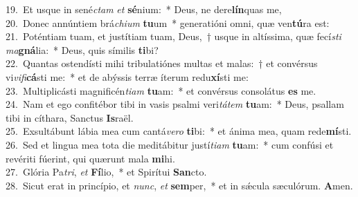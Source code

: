 {19.~}Et usque in sené\textit{ctam} \textit{et} \textbf{sé}nium:~* Deus, ne dere\textbf{lín}quas me,\\
{20.~}Donec annúntiem brá\textit{chi}\textit{um} \textbf{tu}um~* generatióni omni, quæ ven\textbf{tú}ra est:\\
{21.~}Poténtiam tuam, et justítiam tuam, Deus,~† usque in altíssima, quæ fecí\textit{sti} \textit{ma}\textbf{gná}lia:~* Deus, quis símilis \textbf{ti}bi?\\
{22.~}Quantas ostendísti mihi tribulatiónes multas et malas:~† et convérsus vi\textit{vi}\textit{fi}\textbf{cá}sti me:~* et de abýssis terræ íterum redu\textbf{xí}sti me:\\
{23.~}Multiplicásti magnificén\textit{ti}\textit{am} \textbf{tu}am:~* et convérsus consolátus \textbf{es} me.\\
{24.~}Nam et ego confitébor tibi in vasis psalmi veri\textit{tá}\textit{tem} \textbf{tu}am:~* Deus, psallam tibi in cíthara, Sanctus \textbf{Is}raël.\\
{25.~}Exsultábunt lábia mea cum cantá\textit{ve}\textit{ro} \textbf{ti}bi:~* et ánima mea, quam rede\textbf{mí}sti.\\
{26.~}Sed et lingua mea tota die meditábitur justí\textit{ti}\textit{am} \textbf{tu}am:~* cum confúsi et revériti fúerint, qui quærunt mala \textbf{mi}hi.\\
{27.~}Glória Pa\textit{tri}, \textit{et} \textbf{Fí}lio,~* et Spirítui \textbf{San}cto.\\
{28.~}Sicut erat in princípio, et \textit{nunc}, \textit{et} \textbf{sem}per,~* et in sǽcula sæculórum. \textbf{A}men.\\
